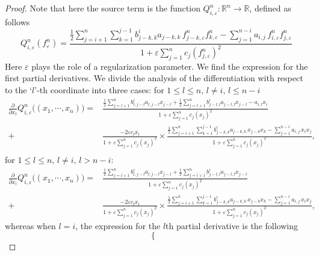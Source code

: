 \documentclass[a4paper,12pt,reqno]{amsart}
\theoremstyle{plain}
\numberwithin{equation}{section}
\begin{document}
	\begin{proof}
		Note that here the source term is the function $\displaystyle{Q_{i,\varepsilon}^n: \mathbb{R}^n\to\mathbb{R}}$, defined as follows
		\[
		Q_{i,\varepsilon}^n(f_{\varepsilon}^n)
		= \frac{
			\frac{1}{2}\displaystyle\sum_{j=i+1}^{n}\sum_{k=1}^{j-1}
			b_{j-k,k}^i a_{j-k,k}\,
			f_{j-k,\varepsilon}^n f_{k,\varepsilon}^n
			-
			\displaystyle\sum_{j=1}^{n-i}
			a_{i,j}\, f_{i,\varepsilon}^n f_{j,\varepsilon}^n
		}{
			1 + \varepsilon\displaystyle\sum_{j=1}^{n}
			c_j (f_{j,\varepsilon}^n)^2
		}
		\]
		Here $\varepsilon$ plays the role of a regularization parameter. We find the expression for the first partial derivatives. We divide the analysis of the differentiation with respect to the `$l$'-th coordinate into three cases: for $1\leq l\leq n, \, l\neq i, \, l\leq n-i$
		\begin{align*}
			\frac{\partial}{\partial x_l}Q_{i,\varepsilon}^n\big((x_1,\cdots,x_n)\big) = &\frac{\frac12 \sum\limits_{j=l+1}^n b^i_{l,j-l}a_{l,j-l} x_{j-l}+\frac12 \sum\limits_{j=l+1}^n b^i_{j-l,l}a_{j-l,l} x_{j-l}-a_{i,l}x_i}{1+\varepsilon\sum\limits_{j=1}^n c_j (x_j)^2}\\
			+ & \frac{-2\varepsilon c_lx_l}{1+\varepsilon\sum\limits_{j=1}^n c_j (x_j)^2} \times \frac{
				\frac{1}{2}\displaystyle\sum_{j=i+1}^{n}\sum_{k=1}^{j-1}
				b_{j-k,k}^i a_{j-k,k}\,
				x_{j-k} x_k
				-
				\displaystyle\sum_{j=1}^{n-i}
				a_{i,j}\, x_ix_j
			}{
				1 + \varepsilon\displaystyle\sum_{j=1}^{n}
				c_j (x_j)^2},\\
		\end{align*}
		for $1\leq l\leq n, \, l\neq i,\, l> n-i$:
		\begin{align*}
			\frac{\partial}{\partial x_l}Q_{i,\varepsilon}^n\big((x_1,\cdots,x_n)\big) = &\frac{\frac12 \sum\limits_{j=l+1}^n b^i_{l,j-l}a_{l,j-l} x_{j-l}+\frac12 \sum\limits_{j=l+1}^n b^i_{j-l,l}a_{j-l,l} x_{j-l}}{1+\varepsilon\sum\limits_{j=1}^n c_j (x_j)^2}\\
			+ & \frac{-2\varepsilon c_lx_l}{1+\varepsilon\sum\limits_{j=1}^n c_j (x_j)^2} \times \frac{
				\frac{1}{2}\displaystyle\sum_{j=i+1}^{n}\sum_{k=1}^{j-1}
				b_{j-k,k}^i a_{j-k,k}\,
				x_{j-k} x_k
				-
				\displaystyle\sum_{j=1}^{n-i}
				a_{i,j}\, x_ix_j
			}{
				1 + \varepsilon\displaystyle\sum_{j=1}^{n}
				c_j (x_j)^2},
		\end{align*}
		whereas when $l=i$, the expression for the $l$th partial derivative is the following
		\begin{equation*}
			\left \{
			\begin{aligned}

\end{aligned}
\end{equation*}
\end{proof}
\end{document}
